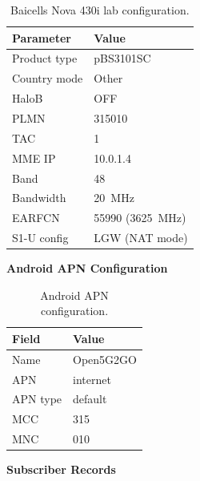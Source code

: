 \documentclass[
    left=1.5in,
    right=1.25in,
    top=1.25in,
    bottom=1.25in
]{CalPolySeniorProject}
\begin{document}
\begin{table}[!ht]
    \centering
    \caption[Nova 430i lab configuration]{Baicells Nova 430i lab configuration.}
    \vspace{0.5\baselineskip}
    \begin{tabular}{ll}
        \toprule
        \textbf{Parameter} & \textbf{Value} \\
        \midrule
        Product type    & pBS3101SC \\
        Country mode    & Other \\
        HaloB           & OFF \\
        PLMN            & 315010 \\
        TAC             & 1 \\
        MME IP          & 10.0.1.4 \\
        Band            & 48 \\
        Bandwidth       & 20~MHz \\
        EARFCN          & 55990 (3625~MHz) \\
        S1-U config     & LGW (NAT mode) \\
        \bottomrule
    \end{tabular}
    \label{tab:nova430i_config}
\end{table}

\textbf{Android APN Configuration}

\begin{table}[!ht]
    \centering
    \caption[Android APN configuration]{Android APN configuration.}
    \vspace{0.5\baselineskip}
    \begin{tabular}{ll}
        \toprule
        \textbf{Field} & \textbf{Value} \\
        \midrule
        Name      & Open5G2GO \\
        APN       & internet \\
        APN type  & default \\
        MCC       & 315 \\
        MNC       & 010 \\
        \bottomrule
    \end{tabular}
    \label{tab:apn_config}
\end{table}

\textbf{Subscriber Records}
\end{document}
